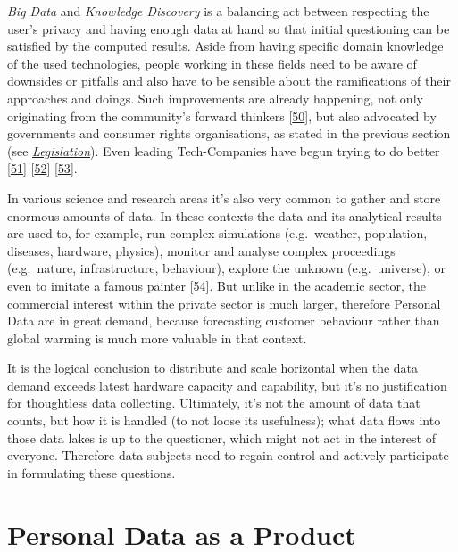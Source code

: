 \documentclass[12pt,english,a4paper,titlepage,cleardoublepage=empty,dottedtoc]{report}
\begin{document}
\emph{Big Data} and \emph{Knowledge Discovery} is a balancing act
between respecting the user's privacy and having enough data at hand so
that initial questioning can be satisfied by the computed results. Aside
from having specific domain knowledge of the used technologies, people
working in these fields need to be aware of downsides or pitfalls and
also have to be sensible about the ramifications of their approaches and
doings. Such improvements are already happening, not only originating
from the community's forward thinkers
{[}\protect\hyperlink{ref-web_2016_the-state-of-big-data}{50}{]}, but
also advocated by governments and consumer rights organisations, as
stated in the previous section (see
\emph{\protect\hyperlink{digital-identity-personal-data-and-ownership}{Legislation}}).
Even leading Tech-Companies have begun trying to do better
{[}\protect\hyperlink{ref-web_2016_apple_customer-letter}{51}{]}
{[}\protect\hyperlink{ref-web_2016_what-is-differential-privacy}{52}{]}
{[}\protect\hyperlink{ref-web_2016_eff_whatsapp-rolls-out-emd-to-end-encryption}{53}{]}.

In various science and research areas it's also very common to gather
and store enormous amounts of data. In these contexts the data and its
analytical results are used to, for example, run complex simulations
(e.g.~weather, population, diseases, hardware, physics), monitor and
analyse complex proceedings (e.g.~nature, infrastructure, behaviour),
explore the unknown (e.g.~universe), or even to imitate a famous painter
{[}\protect\hyperlink{ref-web_2016_research-experiment_ai-rembrandt}{54}{]}.
But unlike in the academic sector, the commercial interest within the
private sector is much larger, therefore Personal Data are in great
demand, because forecasting customer behaviour rather than global
warming is much more valuable in that context.

It is the logical conclusion to distribute and scale horizontal when the
data demand exceeds latest hardware capacity and capability, but it's no
justification for thoughtless data collecting. Ultimately, it's not the
amount of data that counts, but how it is handled (to not loose its
usefulness); what data flows into those data lakes is up to the
questioner, which might not act in the interest of everyone. Therefore
data subjects need to regain control and actively participate in
formulating these questions.

\hypertarget{personal-data-as-a-product}{\section{Personal Data as a
Product}\label{personal-data-as-a-product}}
\end{document}
